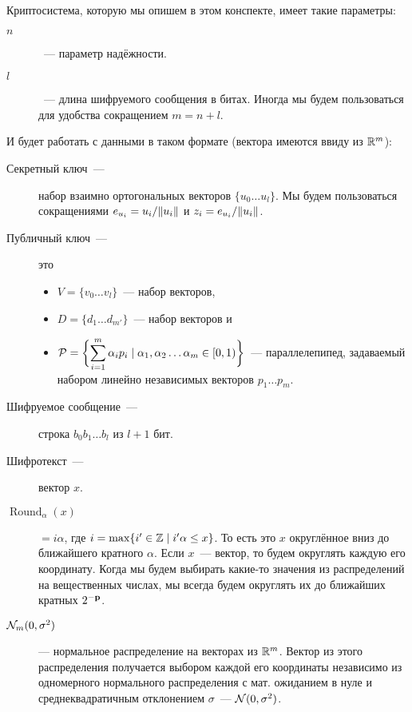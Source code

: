 \documentclass[oneside, a4paper]{article}
\theoremstyle{plain}
\theoremstyle{defn}
\theoremstyle{remark}
\newenvironment{greybox}[1]{%
\begin{tcolorbox}[breakable,enhanced, adjusted title = #1]
}{%
\end{tcolorbox}
}
\DeclareMathOperator{\round}{Round}
\newcommand\p{\ensuremath \mathbf p}
\newcommand\N{\ensuremath \mathcal N}
\newcommand\PP{\ensuremath \mathcal P}
\newcommand\R{\ensuremath \mathbb R}
\newcommand\Z{\ensuremath \mathbb Z}
\DeclarePairedDelimiter\norm{\lVert}{\rVert}
\begin{document}
\begin{greybox}{Криптосистема}
Криптосистема, которую мы опишем в этом конспекте, имеет такие параметры:
\begin{description}
\item[$n$]~--- параметр надёжности.
\item[$l$]~--- длина шифруемого сообщения в битах. Иногда мы будем
пользоваться для удобства сокращением $m = n + l$.
\end{description}

\tcblower

И будет работать с данными в таком формате (вектора имеются ввиду из $\R^m$):
\begin{description}
\item[Секретный ключ~---] набор взаимно ортогональных векторов $\{u_0 \dots
u_l\}$. Мы будем пользоваться сокращениями $e_{u_i} = u_i / \norm{u_i}$ и $z_i =
e_{u_i} / \norm{u_i}$.
\item[Публичный ключ~---] это
\begin{itemize}
\item $V = \{v_0 \dots v_l\}$~--- набор векторов,
\item $D = \{d_1 \dots d_{m'}\}$~--- набор векторов и
\item $\displaystyle \PP = \biggl\{\sum_{i=1}^m \alpha_i p_i \mid
\alpha_1, \alpha_2 \dots \alpha_m \in [0, 1) \biggr\}$~--- параллелепипед,
задаваемый набором линейно независимых векторов $p_1 \dots p_m$.
\end{itemize}
\item[Шифруемое сообщение~---] строка $b_0 b_1 \dots b_l$ из $l+1$ бит.
\item[Шифротекст~---] вектор $x$.
\end{description}
\end{greybox}

\begin{description}
\item[$\round_\alpha(x)$] $= i\alpha$, где $i = \max \{ i' \in \Z \mid i' \alpha
\leq x\}$. То есть это $x$ округлённое вниз до ближайшего кратного $\alpha$.
Если $x$~--- вектор, то будем округлять каждую его координату. Когда мы будем
выбирать какие-то значения из распределений на вещественных числах, мы всегда
будем округлять их до ближайших кратных $2^{-\p}$.
\item[$\N_m(0, \sigma^2)$] --- нормальное распределение на векторах из $\R^m$.
Вектор из этого распределения получается выбором каждой его координаты
независимо из одномерного нормального распределения с мат. ожиданием в нуле и
среднеквадратичным отклонением $\sigma$~--- $\N(0, \sigma^2)$.
\end{description}
\end{document}
